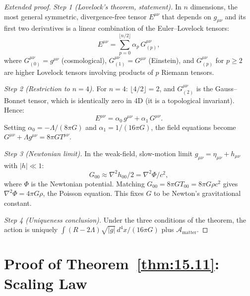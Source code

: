 \begin{proof}[Extended proof]
\emph{Step 1 (Lovelock's theorem, statement).}
In $n$ dimensions, the most general symmetric, divergence-free tensor
$E^{\mu\nu}$ that depends on $g_{\mu\nu}$ and its first two derivatives
is a linear combination of the Euler--Lovelock tensors:
\[
  E^{\mu\nu} = \sum_{p=0}^{\lfloor n/2 \rfloor}
  \alpha_p\,G^{\mu\nu}_{(p)},
\]
where $G^{\mu\nu}_{(0)} = g^{\mu\nu}$ (cosmological),
$G^{\mu\nu}_{(1)} = G^{\mu\nu}$ (Einstein), and $G^{\mu\nu}_{(p)}$
for $p \geq 2$ are higher Lovelock tensors involving products of
$p$ Riemann tensors.

\emph{Step 2 (Restriction to $n = 4$).}
For $n = 4$: $\lfloor 4/2 \rfloor = 2$, and $G^{\mu\nu}_{(2)}$ is the
Gauss--Bonnet tensor, which is identically zero in 4D (it is a
topological invariant).  Hence:
\[
  E^{\mu\nu} = \alpha_0\,g^{\mu\nu} + \alpha_1\,G^{\mu\nu}.
\]
Setting $\alpha_0 = -\Lambda/(8\pi G)$ and $\alpha_1 = 1/(16\pi G)$,
the field equations become $G^{\mu\nu} + \Lambda g^{\mu\nu} = 8\pi G
T^{\mu\nu}$.

\emph{Step 3 (Newtonian limit).}
In the weak-field, slow-motion limit $g_{\mu\nu} = \eta_{\mu\nu}
+ h_{\mu\nu}$ with $|h| \ll 1$:
\[
  G_{00} \approx \nabla^2 h_{00}/2 = \nabla^2\Phi/c^2,
\]
where $\Phi$ is the Newtonian potential.  Matching
$G_{00} = 8\pi G T_{00} = 8\pi G\rho c^2$ gives
$\nabla^2\Phi = 4\pi G\rho$, the Poisson equation.  This fixes $G$ to be
Newton's gravitational constant.

\emph{Step 4 (Uniqueness conclusion).}
Under the three conditions of the theorem, the action is uniquely
$\int(R - 2\Lambda)\sqrt{|g|}\,d^4x / (16\pi G)$ plus
$\mathcal{A}_{\mathrm{matter}}$.
\end{proof}

\section{Proof of Theorem~\ref{thm:15.11}: Scaling Law}
\label{app:pf-scaling}

